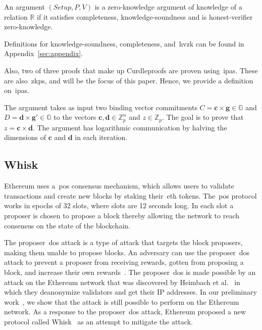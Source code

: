 \begin{definition}
    An argument $(Setup, P, V)$ is a zero-knowledge argument of knowledge of a relation $\mathbb{R}$ if it satisfies completeness, knowledge-soundness and is honest-verifier zero-knowledge.
\end{definition}

Definitions for knowledge-soundness, completeness, and~\gls{hvzk} can be found in Appendix~\ref{sec:appendix}.

Also, two of three proofs that make up Curdleproofs are proven using~\glspl{ipa}.
These are also~\glspl{zkp}, and will be the focus of this paper.
Hence, we provide a definition on~\glspl{ipa}.

\begin{definition}
    The argument takes as input two binding vector commitments $C=\mathbf{c}\times\mathbf{g}\in\mathbb{G}$ and $D=\mathbf{d}\times\mathbf{g'}\in\mathbb{G}$ to the vectors $\mathbf{c},\mathbf{d}\in\mathbb{Z}_p^n$ and $z\in\mathbb{Z}_p$.
    The goal is to prove that $z=\mathbf{c}\times\mathbf{d}$.
    The argument has logarithmic communication by halving the dimensions of $\mathbf{c}$ and $\mathbf{d}$ in each iteration.
\end{definition}

\subsection{Whisk}\label{subsec:related-work-whisk}
Ethereum uses a~\gls{pos} consensus mechanism, which allows users to validate transactions and create new blocks by staking their~\gls{eth} tokens.
The~\gls{pos} protocol works in epochs of 32 slots, where slots are 12 seconds long.
In each slot a proposer is chosen to propose a block thereby allowing the network to reach consensus on the state of the blockchain.

The proposer~\gls{dos} attack is a type of attack that targets the block proposers, making them unable to propose blocks.
An adversary can use the proposer~\gls{dos} attack to prevent a proposer from receiving rewards, gotten from proposing a block, and increase their own rewards~\cite{EthereumSSLE2024}.
The proposer~\gls{dos} is made possible by an attack on the Ethereum network that was discovered by Heimbach et al.~\cite{heimbach2024deanonymizingethereumvalidatorsp2p} in which they deanonymize validators and get their IP addresses.
In our preliminary work~\cite{ouroldpaper}, we show that the attack is still possible to perform on the Ethereum network.
As a response to the proposer~\gls{dos} attack, Ethereum proposed a new protocol called Whisk~\cite{Whisk2024} as an attempt to mitigate the attack.

